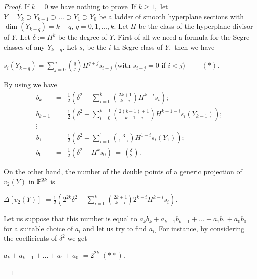 \documentclass{amsart}
\theoremstyle{definition}
\begin{document}
\begin{proof}
If $k=0$ we have nothing to prove. If $k\geq 1,$ let $Y=Y_{k}\supset
Y_{k-1}\supset \dots\supset Y_{1}\supset Y_{0}$ be a ladder of
smooth hyperplane sections with $\dim (Y_{k-q})=k-q$,
$q=0,1,\dots,k$. Let $H$ be the class of the hyperplane divisor of
$Y$. Let $\delta :=H^{k}$ be the degree of $Y$. First of all we need
a formula for the Segre classes of any $Y_{k-q}$. Let $s_{i}$ be the
$i$-th Segre class of $Y,$ then we have

\begin{center}
$s_{i}(Y_{k-q})=\sum\limits_{j=0}^{q}\binom{q}{j}H^{q+j}s_{i-j}$ (with $s_{i-j}=0$ if $i<j$) $\qquad (*).$
\end{center}

By using \cite[Theorem 3.4]{ps} we have
$$
\begin{array}{lcl}

b_{k} & = & \frac{1}{2}\left( \delta ^{2}-\sum\limits_{i=0}^{k}\binom{2k+1}{k-i}H^{k-i}s_{i}\right) ;\\

b_{k-1} & = & \frac{1}{2}\left( \delta ^{2}-\sum\limits_{i=0}^{k-1}\binom{2(k-1)+1}{k-1-i}H^{k-1-i}s_{i}(Y_{k-1})\right) ;\\

\vdots & & \\

b_{1} & = & \frac{1}{2}\left( \delta ^{2}-\sum\limits_{i=0}^{1}\binom{3}{1-i}H^{1-i}s_{i}(Y_{1})\right) ;\\

b_{0} & = & \frac{1}{2}\left( \delta ^{2}-H^{k}s_{0}\right)\, =\,
\binom{\delta}{2} .
\end{array}
$$

On the other hand, the number of the double points of a generic
projection of $v_{2}(Y)$ in $\Bbb{P}^{2k}$ is

\begin{center}
$\Delta [v_{2}(Y)]$ $=\frac{1}{2}\left( 2^{2k}\delta
^{2}-\sum\limits_{i=0}^{k}\binom{2k+1}{k-i}2^{k-i}H^{k-i}s_{i}\right) .\;$
\end{center}

Let us suppose that this number is equal to
$a_{k}b_{k}+a_{k-1}b_{k-1}+\dots+a_{1}b_{1}+a_{0}b_{0}$ for a
suitable choice of $a_{i}\;$and let us try to find $a_{i.}$ For
instance, by considering the coefficients of $\delta ^{2}$ we get

\begin{center}
$a_{k}+a_{k-1}+\dots+a_{1}+a_{0}$ $=2^{2k}$ \qquad $(**).$
\end{center}


\end{proof}
\end{document}
